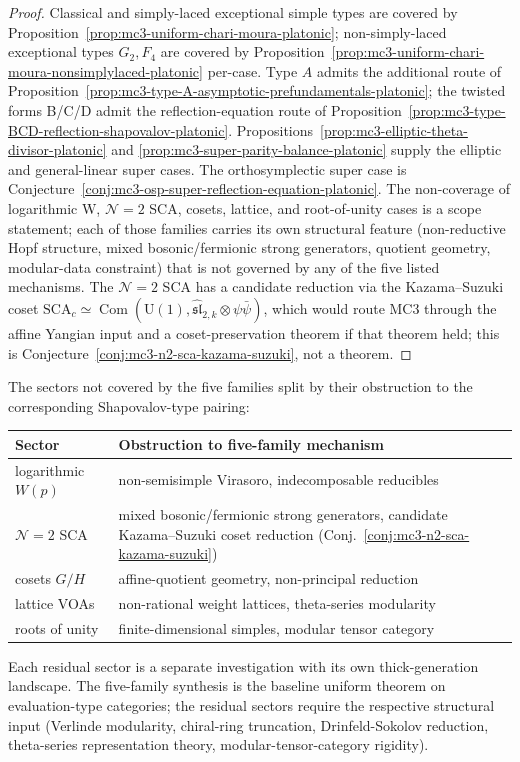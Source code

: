 \begin{proof}
Classical and simply-laced exceptional simple types are covered by
Proposition~\ref{prop:mc3-uniform-chari-moura-platonic};
non-simply-laced exceptional types $G_2, F_4$ are covered by
Proposition~\ref{prop:mc3-uniform-chari-moura-nonsimplylaced-platonic}
per-case. Type
$A$ admits the additional route of
Proposition~\ref{prop:mc3-type-A-asymptotic-prefundamentals-platonic}; the
twisted forms B/C/D admit the reflection-equation route of
Proposition~\ref{prop:mc3-type-BCD-reflection-shapovalov-platonic}.
Propositions~\ref{prop:mc3-elliptic-theta-divisor-platonic} and
\ref{prop:mc3-super-parity-balance-platonic} supply the elliptic and
general-linear super cases. The orthosymplectic super case is
Conjecture~\ref{conj:mc3-osp-super-reflection-equation-platonic}.
The non-coverage of logarithmic W, $\mathcal{N}=2$ SCA,
cosets, lattice, and root-of-unity cases is a scope statement;
each of those families carries its own structural feature
(non-reductive Hopf structure, mixed bosonic/fermionic strong
generators, quotient geometry, modular-data constraint) that is
not governed by any of the five listed mechanisms. The
$\mathcal{N}=2$ SCA has a candidate reduction via the
Kazama--Suzuki coset
$\mathrm{SCA}_c \simeq
\operatorname{Com}(\mathrm{U}(1), \widehat{\mathfrak{sl}}_{2,k}
\otimes \psi\bar\psi)$, which would route MC3 through the affine
Yangian input and a coset-preservation theorem if that theorem held;
this is
Conjecture~\ref{conj:mc3-n2-sca-kazama-suzuki}, not a theorem.
\end{proof}

\begin{remark}
\label{rem:residual-sector-landscape}
The sectors not covered by the five families split by their
obstruction to the corresponding Shapovalov-type pairing:
\begin{center}
\renewcommand{\arraystretch}{1.15}
\begin{tabular}{ll}
\toprule
\textbf{Sector} & \textbf{Obstruction to five-family mechanism} \\
\midrule
logarithmic $W(p)$ & non-semisimple Virasoro, indecomposable
 reducibles \\
$\mathcal{N}=2$ SCA & mixed bosonic/fermionic strong
 generators, candidate Kazama--Suzuki coset
 reduction (Conj.~\ref{conj:mc3-n2-sca-kazama-suzuki}) \\
cosets $G/H$ & affine-quotient geometry, non-principal reduction \\
lattice VOAs & non-rational weight lattices, theta-series
 modularity \\
roots of unity & finite-dimensional simples, modular tensor
 category \\
\bottomrule
\end{tabular}
\end{center}
Each residual sector is a separate investigation with its own
thick-generation landscape. The five-family synthesis is the
baseline uniform theorem on evaluation-type categories; the
residual sectors require the respective structural input
(Verlinde modularity, chiral-ring truncation, Drinfeld-Sokolov
reduction, theta-series representation theory,
modular-tensor-category rigidity).
\end{remark}

